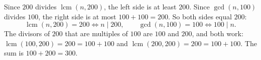 Since $200$ divides $\operatorname{lcm}(n,200)$, the left side is at least $200$. Since $\gcd(n,100)$ divides $100$, the right side is at most $100+100=200$. So both sides equal $200$:
\[\operatorname{lcm}(n,200)=200\iff n\mid200,\qquad\gcd(n,100)=100\iff100\mid n.\]
The divisors of $200$ that are multiples of $100$ are $100$ and $200$, and both work: $\operatorname{lcm}(100,200)=200=100+100$ and $\operatorname{lcm}(200,200)=200=100+100$. The sum is $100+200=\boxed{300}$.
